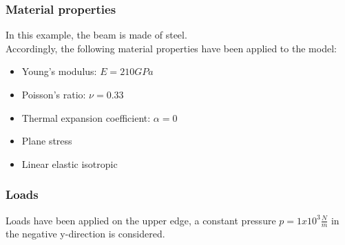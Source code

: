 \subsubsection{Material properties}
In this example, the beam is made of steel.\\[3pt]
Accordingly, the following material properties have been applied to the model: 
\begin{itemize}
\item Young's modulus: $E = 210 GPa$
\item Poisson's ratio: $\nu = 0.33$
\item Thermal expansion coefficient: $\alpha = 0$
\item Plane stress
\item Linear elastic isotropic
\end{itemize}
\subsubsection{Loads}
Loads have been applied on the upper edge, a constant pressure $p = 1x10^{3} \frac{N}{m}$ in the negative y-direction is considered.
